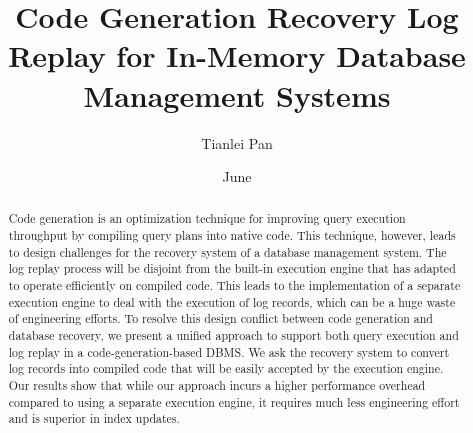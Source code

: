 \documentclass[12pt]{cmuthesis}
\begin{document}
 
\frontmatter

\pagestyle{empty}

\title{ %
{\bf Code Generation Recovery Log Replay for In-Memory Database Management Systems}}
\author{Tianlei Pan}
\date{June}
\trnumber{}


\support{}
\disclaimer{}



\maketitle

\begin{dedication}
\end{dedication}

\pagestyle{plain} %


\begin{abstract}
Code generation is an optimization technique for improving query execution throughput by compiling query plans into native code. This technique, however, leads to design challenges for the recovery system of a database management system. The log replay process will be disjoint from the built-in execution engine that has adapted to operate efficiently on compiled code. This leads to the implementation of a separate execution engine to deal with the execution of log records, which can be a huge waste of engineering efforts. To resolve this design conflict between code generation and database recovery, we present a unified approach to support both query execution and log replay in a code-generation-based DBMS. We ask the recovery system to convert log records into compiled code that will be easily accepted by the execution engine. Our results show that while our approach incurs a higher performance overhead compared to using a separate execution engine, it requires much less engineering effort and is superior in index updates.
\end{abstract}
\end{document}
